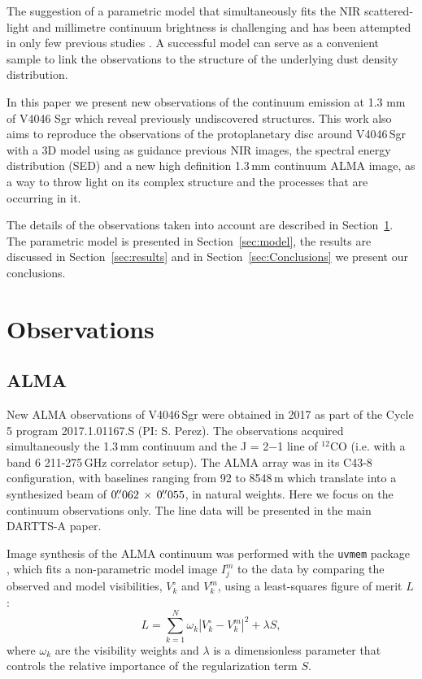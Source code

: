 \documentclass[fleqn,usenatbib,useAMS]{mnras}
\begin{document}
The suggestion of a parametric model that simultaneously fits the NIR scattered-light and millimetre continuum brightness is challenging and has been attempted in only few previous studies \citep[e.g.][]{Dong_2018,2019MNRAS.486..304B, Ru_z_Rodr_guez_2019}. A successful model can serve as a convenient sample to link the observations to the structure of the underlying dust density distribution.

In this paper we present new observations of the continuum emission at 1.3 mm of V4046 Sgr which reveal previously undiscovered structures. This work also aims to reproduce the observations of the protoplanetary disc around V4046\,Sgr with a 3D model using as guidance previous NIR images, the spectral energy distribution (SED) and a new high definition 1.3\,mm continuum ALMA image, as a way to throw light on its complex structure and the processes that are occurring in it.

The details of the observations taken into account are described in Section~\ref{sec:Observations}. The parametric model is presented in Section~\ref{sec:model}, the results are discussed in Section~\ref{sec:results} and in Section~\ref{sec:Conclusions} we present our conclusions.

\section{Observations} \label{sec:Observations}
\subsection{ALMA}  \label{subsec:ALMA}

New ALMA observations of V4046\,Sgr were obtained in 2017 as part of the Cycle 5 program 2017.1.01167.S (PI: S. Perez). The observations acquired simultaneously the 1.3\,mm continuum and the J = 2$-$1 line of $^{12}$CO (i.e. with a band 6 211-275\,GHz correlator setup). The ALMA array was in its C43-8 configuration, with baselines ranging from 92 to 8548\,m which translate into a synthesized beam of $0\hbox{$.\!\!^{\prime\prime}$}062 \,\times \, 0\hbox{$.\!\!^{\prime\prime}$}055$, in natural weights. Here we focus on the continuum observations only. The line data will be presented in the main DARTTS-A paper.

Image synthesis of the ALMA continuum was performed with the {\tt uvmem} package \citep{2006ApJ...639..951C, 2018A&C....22...16C}, which fits a non-parametric model image $I^m_j$ to the data by comparing the observed and model visibilities, $V^\circ_k$ and $V^m_k$, using a least-squares figure of merit $L$:
\begin{equation}
  L = \sum_{k=1}^N \omega_k  |V^\circ_k - V^m_k|^2 + \lambda S,
\end{equation}
where $\omega_k$ are the visibility weights and $\lambda$ is a dimensionless parameter that controls the relative importance of the regularization term $S$.
\end{document}
